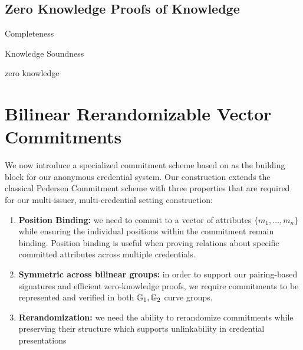 \subsection{Zero Knowledge Proofs of Knowledge}



\begin{definition}[Completeness]
   Completeness
\end{definition}


\begin{definition}
    Knowledge Soundness
\end{definition}


\begin{definition}
    zero knowledge
\end{definition}


% 
% 


























% 
% 


\newpage
\section{Bilinear Rerandomizable Vector Commitments}
We now introduce a specialized commitment scheme based on \cite{tomescu2022utt} as the building block for our anonymous credential system. Our construction extends the classical Pedersen Commitment scheme with three properties that are required for our multi-issuer, multi-credential setting construction:
\begin{enumerate}
    \item \textbf{Position Binding: } we need to commit to a vector of attributes $\{m_1, \ldots, m_n\}$ while ensuring the individual positions within the commitment remain binding. Position binding is useful when proving relations about specific committed attributes across multiple credentials. 
    
    \item \textbf{Symmetric across bilinear groups: } in order to support our pairing-based signatures and efficient zero-knowledge proofs, we require commitments to be represented and verified in both $\mathbb{G}_1, \mathbb{G}_2$ curve groups. 
    
    \item \textbf{Rerandomization: } we need the ability to rerandomize commitments while preserving their structure which supports unlinkability in credential presentations
\end{enumerate}

